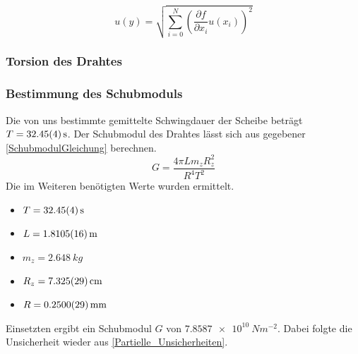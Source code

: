 \documentclass[
	a4paper,
	12pt,
	pagesize,
	ngerman
]{scrartcl}
\begin{document}
	\begin{equation}
	u(y) = \sqrt{  \sum_{i=0}^{N} \left( \frac{\partial f}{\partial x_i}u(x_i)\right)^2  }
	\label{Partielle_Unsicherheiten}
	\end{equation}
	
	\subsubsection{Torsion des Drahtes}
	\subsubsection*{Bestimmung des Schubmoduls}
	Die von uns bestimmte gemittelte Schwingdauer der Scheibe beträgt $T=\SI{32,45 \pm 0,04}{s}$.
	Der Schubmodul des Drahtes lässt sich aus gegebener \cref{SchubmodulGleichung} berechnen.
	\begin{equation}
		\label{SchubmodulGleichung}
		G = \frac{4\pi Lm_zR_z^2}{R^4T^2}
	\end{equation}
	Die im Weiteren benötigten Werte wurden ermittelt. 
	\begin{itemize}
		\item $T=\SI{32,45 \pm 0,04}{s}$
		\item $L = \SI{1,8105 \pm 0,0016 }{m}$
		\item $m_z = \SI{2,648}{kg}$
		\item $R_z = \SI{7,325 \pm 0,029}{cm}$
		\item $R = \SI{0,25 \pm 0,0029}{mm}$
	\end{itemize}
	Einsetzten ergibt ein Schubmodul $G$ von $\SI{7,8587e10}{Nm^{-2}}$. Dabei folgte die Unsicherheit wieder aus \cref{Partielle_Unsicherheiten}.
\end{document}
